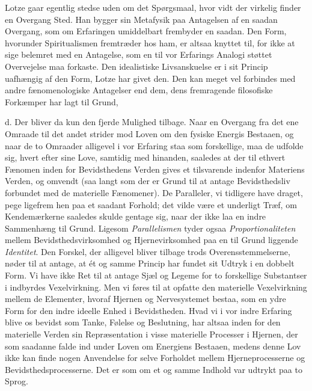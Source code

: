 \documentclass[12pt,a4paper,openany]{book}
\newcommand{\opage}[1]{\marginnote{\footnotesize\textit{[#1]}}}
\begin{document}
Lotze gaar egentlig stedse uden om det Spørgsmaal, hvor vidt der
virkelig finder en Overgang Sted. Han bygger sin Metafysik paa
Antagelsen af en saadan Overgang, som om Erfaringen umiddelbart
frembyder en saadan. Den Form, hvorunder Spiritualismen fremtræder hos
ham, er altsaa knyttet til, for ikke at sige belemret med en Antagelse,
som en til vor Erfarings Analogi støttet Overvejelse maa forkaste. Den
idealistiske Livsanskuelse er i sit Princip uafhængig af den Form, Lotze
har givet den. Den kan meget vel forbindes med andre fænomenologiske
Antagelser end dem, dens fremragende filosofiske Forkæmper har lagt til
Grund,

d. Der bliver da kun den fjerde Mulighed tilbage. Naar en Overgang fra
det ene Omraade til det andet strider mod Loven om den fysiske Energis
Bestaaen, og naar de to Omraader alligevel i vor Erfaring staa som
forskellige, maa de udfolde sig, hvert efter sine Love, samtidig med
hinanden, saaledes at der til ethvert Fænomen inden for Bevidsthedens
\opage{77}Verden gives et tilsvarende indenfor Materiens Verden, og
omvendt (saa langt som der er Grund til at antage Bevidsthedsliv
forbundet med de materielle Fænomener). De Paralleler, vi tidligere have
draget, pege ligefrem hen paa et saadant Forhold; det vilde være et
underligt Træf, om Kendemærkerne saaledes skulde gentage sig, naar der
ikke laa en indre Sammenhæng til Grund. Ligesom \emph{Parallelismen}
tyder ogsaa \emph{Proportionaliteten} mellem Bevidsthedsvirksomhed og
Hjernevirksomhed paa en til Grund liggende \emph{Identitet}. Den
Forskel, der alligevel bliver tilbage trods Overensstemmelserne, nøder
til at antage, at ét og samme Princip har fundet sit Udtryk i en dobbelt
Form. Vi have ikke Ret til at antage Sjæl og Legeme for to forskellige
Substantser i indbyrdes Vexelvirkning. Men vi føres til at opfatte den
materielle Vexelvirkning mellem de Elementer, hvoraf Hjernen og
Nervesystemet bestaa, som en ydre Form for den indre ideelle Enhed i
Bevidstheden. Hvad vi i vor indre Erfaring blive os bevidst som Tanke,
Følelse og Beslutning, har altsaa inden for den materielle Verden sin
Repræsentation i visse materielle Processer i Hjernen, der som saadanne
falde ind under Loven om Energiens Bestaaen, medens denne Lov ikke kan
finde nogen Anvendelse for selve Forholdet mellem Hjerneprocesserne og
Bevidsthedsprocesserne. Det er som om et og samme Indhold var udtrykt
paa to Sprog.
\end{document}
